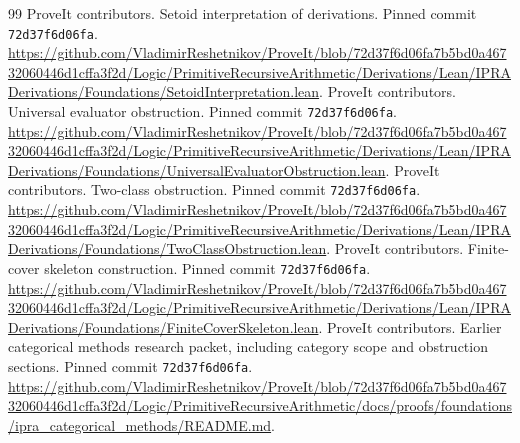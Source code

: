 \begin{thebibliography}{99}
 ProveIt contributors. Setoid interpretation of derivations. Pinned commit \texttt{72d37f6d06fa}. \url{https://github.com/VladimirReshetnikov/ProveIt/blob/72d37f6d06fa7b5bd0a46732060446d1cffa3f2d/Logic/PrimitiveRecursiveArithmetic/Derivations/Lean/IPRADerivations/Foundations/SetoidInterpretation.lean}.
 ProveIt contributors. Universal evaluator obstruction. Pinned commit \texttt{72d37f6d06fa}. \url{https://github.com/VladimirReshetnikov/ProveIt/blob/72d37f6d06fa7b5bd0a46732060446d1cffa3f2d/Logic/PrimitiveRecursiveArithmetic/Derivations/Lean/IPRADerivations/Foundations/UniversalEvaluatorObstruction.lean}.
 ProveIt contributors. Two-class obstruction. Pinned commit \texttt{72d37f6d06fa}. \url{https://github.com/VladimirReshetnikov/ProveIt/blob/72d37f6d06fa7b5bd0a46732060446d1cffa3f2d/Logic/PrimitiveRecursiveArithmetic/Derivations/Lean/IPRADerivations/Foundations/TwoClassObstruction.lean}.
 ProveIt contributors. Finite-cover skeleton construction. Pinned commit \texttt{72d37f6d06fa}. \url{https://github.com/VladimirReshetnikov/ProveIt/blob/72d37f6d06fa7b5bd0a46732060446d1cffa3f2d/Logic/PrimitiveRecursiveArithmetic/Derivations/Lean/IPRADerivations/Foundations/FiniteCoverSkeleton.lean}.
 ProveIt contributors. Earlier categorical methods research packet, including category scope and obstruction sections. Pinned commit \texttt{72d37f6d06fa}. \url{https://github.com/VladimirReshetnikov/ProveIt/blob/72d37f6d06fa7b5bd0a46732060446d1cffa3f2d/Logic/PrimitiveRecursiveArithmetic/docs/proofs/foundations/ipra_categorical_methods/README.md}.
\end{thebibliography}

